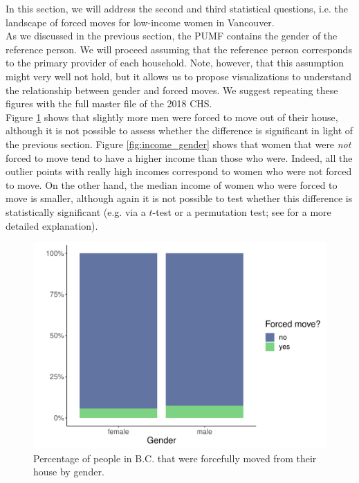 \documentclass[11pt]{article}
\begin{document}
In this section, we will address the second and third statistical
questions, i.e. the landscape of forced moves for low-income women
in Vancouver.
\\

As we discussed in the previous section, the PUMF contains the gender
of the reference person. We will proceed assuming that the reference
person corresponds to the primary provider of each household.
Note, however, that this assumption might very well not hold, but it
allows us to propose visualizations to understand the relationship
between gender and forced moves. We suggest repeating these figures
with the full master file of the 2018 CHS.
\\


Figure \ref{fig:fm_gender} shows that slightly more men were forced to move
out of their house, although it is not possible to assess whether the
difference is significant in light of the previous section.
Figure \ref{fig:income_gender} shows that women that were \textit{not}
forced to move tend to have a higher income than those who were.
Indeed, all the outlier points with really high incomes correspond to
women who were not forced to move.
On the other hand, the median income of women who were forced to move
is smaller, although again it is not possible to test whether this
difference is statistically significant (e.g. via a $t$-test or a
permutation test; see \cite[Ch.~9.3]{agresti} for a more detailed explanation).


\begin{figure}
  \centering
  \includegraphics[scale=0.5]{fig/fm_gender.pdf}
  \caption{Percentage of people in B.C. that were forcefully moved
  from their house by gender.}
  \label{fig:fm_gender}
\end{figure}
\end{document}
